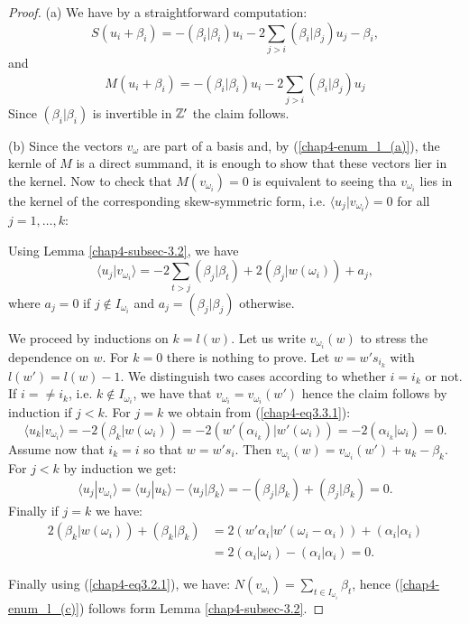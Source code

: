 \begin{proof}
(a) We have by a straightforward computation:
$$
S(u_{i} + \beta_{i}) = - (\beta_{i} | \beta_{i})u_{i}-2 \sum\limits_{j>i}(\beta_{i}|\beta_{j})u_{j}- \beta_{i},
$$
and
$$
M(u_{i} + \beta_{i}) = - (\beta_{i} | \beta_{i})u_{i}-2 \sum\limits_{j>i}(\beta_{i}|\beta_{j})u_{j}
$$
Since $(\beta_{i} | \beta_{i})$ is invertible in $\mathbb{Z}'$ the claim follows.

(b) Since the vectors $v_{\omega}$ are part of a basis and, by (\ref{chap4-enum_l_(a)}), the kernle of $M$ is a direct summand, it is enough to show that these vectors lier in the kernel. Now to check that $M(v_{\omega_{i}}) =0$ is equivalent to seeing tha $v_{\omega_{i}}$ lies in the kernel of the corresponding skew-symmetric form, i.e. $\langle u_{j} | v_{\omega_{i}}\rangle = 0$ for all $j = 1,\ldots, k$:

Using Lemma \ref{chap4-subsec-3.2}, we have
\begin{equation*}
\langle u_{j} | v_{\omega_{i}}\rangle = -2\sum\limits_{t > j}(\beta_{j} | \beta_{t}) + 2(\beta_{j}| w(\omega_{i})) + a_{j},\tag{3.3.1}\label{chap4-eq3.3.1}
\end{equation*}\pageoriginale
where $a_{j} = 0$ if $j \not\in I_{\omega_{i}}$ and $a_{j} = (\beta_{j} | \beta_{j})$ otherwise.

We proceed by inductions on $k= l(w)$. Let us write $v_{\omega_{i}}(w)$ to stress the dependence on $w$. For $k=0$ there is nothing to prove. Let $w=w's_{i_{k}}$ with $l(w')=l(w)-1$. We distinguish two cases according to whether $i=i_{k}$ or not. If $i=\neq i_{k}$, i.e. $k\not\in I_{\omega_{i}}$, we have that $v_{\omega_{i}} = v_{\omega_{i}}(w')$ hence the claim follows by induction if $j < k$. For $j =k$ we obtain from (\ref{chap4-eq3.3.1}):
$$
\langle u_{k} | v_{\omega_{i}}\rangle = -2(\beta_{k} | w(\omega_{i})) = -2(w'(\alpha_{i_{k}}) | w'(\omega_{i})) = -2(\alpha_{i_{k}} | \omega_{i}) = 0.
$$
Assume now that $i_{k} = i$ so that $w=w's_{i}$. Then $v_{\omega_{i}}(w)=v_{\omega_{i}}(w') + u_{k} -\beta_{k}$. For $j < k$ by induction we get:
$$
\langle u_{j} | v_{\omega_{i}}\rangle = \langle u_{j} | u_{k}\rangle -\langle u_{j} | \beta_{k}\rangle = -(\beta_{j} | \beta_{k}) + (\beta_{j} | \beta_{k}) = 0.
$$
Finally if $j=k$ we have:
\begin{align*}
2(\beta_{k}|w(\omega_{i})) + (\beta_{k}|\beta_{k}) &= 2(w' \alpha_{i} | w' (\omega_{i}-\alpha_{i})) + (\alpha_{i} | \alpha_{i})\\
& = 2(\alpha_{i} | \omega_{i})-(\alpha_{i}| \alpha_{i}) = 0.
\end{align*}

Finally using (\ref{chap4-eq3.2.1}), we have: $N(v_{\omega_{i}}) = \sum_{t\in I_{\omega_{i}}} \beta_{t}$, hence (\ref{chap4-enum_l_(c)}) follows form Lemma \ref{chap4-subsec-3.2}.
\end{proof}

